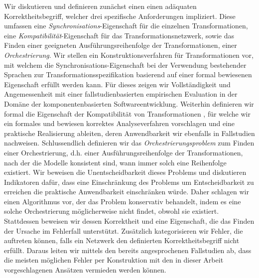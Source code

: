 Wir diskutieren und definieren zunächst einen einen adäquaten Korrektheitsbegriff, welcher drei spezifische Anforderungen impliziert. Diese umfassen eine \emph{Synchronisations}-Eigenschaft für die einzelnen Transformationen, eine \emph{Kompatibilität}-Eigenschaft für das Transformationsnetzwerk, sowie das Finden einer geeigneten Ausführungsreihenfolge der Transformationen, einer \emph{Orchestrierung}.
Wir stellen ein Konstruktionsverfahren für Transformationen vor, mit welchem die Synchronisations-Eigenschaft bei der Verwendung bestehender Sprachen zur Transformationsspezifikation basierend auf einer formal bewiesenen Eigenschaft erfüllt werden kann.
Für dieses zeigen wir Vollständigkeit und Angemessenheit mit einer fallstudienbasierten empirischen Evaluation in der Domäne der komponentenbasierten Softwareentwicklung.
Weiterhin definieren wir formal die Eigenschaft der Kompatibilität von Transformationen%
, für welche wir ein formales und bewiesen korrektes Analyseverfahren vorschlagen und eine praktische Realisierung ableiten, deren Anwendbarkeit wir ebenfalls in Fallstudien nachweisen.
Schlussendlich definieren wir das \emph{Orchestrierungsproblem} zum Finden einer Orchestrierung, d.h. einer Ausführungsreihenfolge der Transformationen, nach der die Modelle konsistent sind, wann immer solch eine Reihenfolge existiert. %
Wir beweisen die Unentscheidbarkeit dieses Problems und diskutieren Indikatoren dafür, dass eine Einschränkung des Problems um Entscheidbarkeit zu erreichen die praktische Anwendbarkeit einschränken würde.
Daher schlagen wir einen Algorithmus vor, der das Problem konservativ behandelt, indem es eine solche Orchestrierung möglicherweise nicht findet, obwohl sie existiert.
Stattdessen beweisen wir dessen Korrektheit und eine Eigenschaft, die das Finden der Ursache im Fehlerfall unterstützt.
Zusätzlich kategorisieren wir Fehler, die auftreten können, falls ein Netzwerk den definierten Korrektheitsbegriff nicht erfüllt.
Daraus leiten wir mittels den bereits angesprochenen Fallstudien ab, dass die meisten möglichen Fehler per Konstruktion mit den in dieser Arbeit vorgeschlagenen Ansätzen vermieden werden können.

